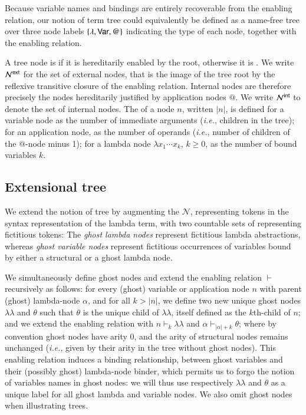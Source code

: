\documentclass{elsarticle}
\makeatletter
\theoremstyle{plain}
\theoremstyle{definition}
\newcommand\Nodes{\mathcal{N}}%
\newcommand{\ghostlmd}{{\lambda\!\!\lambda}}
\newcommand{\ghostvar}{\theta}
\newcommand{\enables}{\vdash} %
\newcommand{\ExternalNodes}{\Nodes^{\sf ext}}
\newcommand{\InternalNodes}{\Nodes^{\sf int}}
\renewcommand\ie{{\it i.e.\@\xspace}}
\makeatother
\begin{document}
Because variable names and bindings are entirely recoverable from the enabling relation, our notion of term tree could equivalently be defined as a name-free tree over three node labels $\{ \lambda, {\sf Var}, @ \}$ indicating the type of each node, together with the enabling relation.

A tree node is  if it is hereditarily enabled by the root, otherwise it is . We write $\ExternalNodes$ for the set of external nodes, that is the image of the tree root by the reflexive transitive closure of the enabling relation. Internal nodes are therefore precisely the nodes hereditarily justified by application nodes $@$. We write $\InternalNodes$ to denote the set of internal nodes.
The  of a node $n$, written $|n|$,
is defined for a variable node as the number of immediate arguments (\ie, children in the tree); for an application node, as the number of operands (\ie, number of children of the $@$-node minus 1); for a lambda node $\lambda x_1 \cdots x_k$, $k\geq 0$, as the number of bound variables $k$.

\subsection{Extensional tree}
We extend the notion of tree by augmenting the
  $\Nodes$, representing tokens in the syntax representation of the lambda term,
with two countable sets of  representing fictitious tokens: The \emph{ghost lambda nodes}
represent fictitious lambda abstractions,
whereas \emph{ghost variable nodes} represent fictitious
occurrences of variables bound by either a structural or a ghost lambda node.

We simultaneously define ghost nodes and extend the enabling relation $\enables$ recursively as follows: for every (ghost) variable or application node $n$ with parent (ghost) lambda-node $\alpha$, and for all $k>|n|$, we define two new unique ghost nodes $\ghostlmd$ and $\ghostvar$
such that
$\ghostvar$ is the unique child of $\ghostlmd$, itself defined as the $k$th-child of $n$;
and we extend the enabling relation with $n \enables_k \ghostlmd$
and $\alpha \enables_{|\alpha|+ k} \ghostvar$; where by convention ghost nodes have arity $0$, and the arity of structural nodes remains unchanged (\ie, given by their arity in the tree without ghost nodes).
This enabling relation induces a binding relationship, between ghost variables and their (possibly ghost) lambda-node binder, which permits us to forgo the notion of variables names in ghost nodes: we will thus
use respectively $\ghostlmd$ and $\ghostvar$ as a unique label for all ghost lambda and variable nodes. We also omit ghost nodes when illustrating trees.
\end{document}
